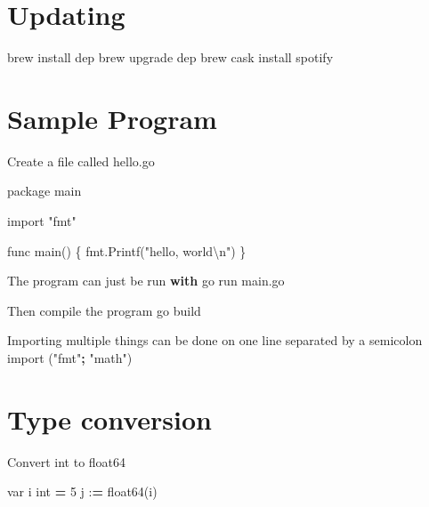 \documentclass[]{book}
\newenvironment{Shaded}{\begin{snugshade}}{\end{snugshade}}
\newcommand{\DecValTok}[1]{\textcolor[rgb]{0.00,0.00,0.81}{#1}}
\newcommand{\CharTok}[1]{\textcolor[rgb]{0.31,0.60,0.02}{#1}}
\newcommand{\StringTok}[1]{\textcolor[rgb]{0.31,0.60,0.02}{#1}}
\newcommand{\ImportTok}[1]{#1}
\newcommand{\ControlFlowTok}[1]{\textcolor[rgb]{0.13,0.29,0.53}{\textbf{#1}}}
\newcommand{\OperatorTok}[1]{\textcolor[rgb]{0.81,0.36,0.00}{\textbf{#1}}}
\newcommand{\BuiltInTok}[1]{#1}
\newcommand{\ExtensionTok}[1]{#1}
\newcommand{\NormalTok}[1]{#1}
\begin{document}
\section{Updating}\label{updating}

\begin{Shaded}
\begin{Highlighting}[]
\ExtensionTok{brew}\NormalTok{ install dep}
\ExtensionTok{brew}\NormalTok{ upgrade dep}
\ExtensionTok{brew}\NormalTok{ cask install spotify}
\end{Highlighting}
\end{Shaded}

\section{Sample Program}\label{sample-program}

Create a file called hello.go

\begin{Shaded}
\begin{Highlighting}[]
\NormalTok{package main}

\ImportTok{import} \StringTok{"fmt"}

\NormalTok{func main() \{}
\NormalTok{    fmt.Printf(}\StringTok{"hello, world}\CharTok{\textbackslash{}n}\StringTok{"}\NormalTok{)}
\NormalTok{\}}

\NormalTok{The program can just be run }\ControlFlowTok{with}
\NormalTok{go run main.go}

\NormalTok{Then }\BuiltInTok{compile}\NormalTok{ the program}
\NormalTok{    go build}

\NormalTok{Importing multiple things can be done on one line separated by a semicolon}
    \ImportTok{import}\NormalTok{ (}\StringTok{"fmt"}\OperatorTok{;} \StringTok{"math"}\NormalTok{)}
\end{Highlighting}
\end{Shaded}

\section{Type conversion}\label{type-conversion}

Convert int to float64

\begin{Shaded}
\begin{Highlighting}[]
\NormalTok{var i }\BuiltInTok{int} \OperatorTok{=} \DecValTok{5}
\NormalTok{j :}\OperatorTok{=}\NormalTok{ float64(i)}
\end{Highlighting}
\end{Shaded}
\end{document}
